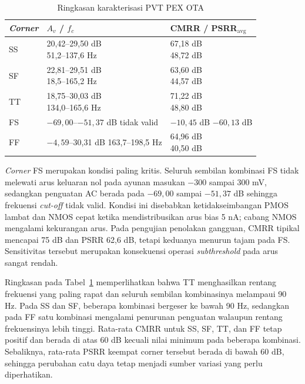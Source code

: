 \begin{table}[!ht]
\caption{Ringkasan karakterisasi PVT PEX OTA}
\label{tab:pvt-ringkas}
\centering
\footnotesize
\setlength{\tabcolsep}{3pt}
\renewcommand{\arraystretch}{1.12}
\begin{tabularx}{\columnwidth}{@{}l
  >{\centering\arraybackslash}X
  >{\centering\arraybackslash}X@{}}
\toprule
\textit{Corner} & $A_v$ / $f_c$ & CMRR / PSRR$_{\mathrm{avg}}$ \\
\midrule
SS & \shortstack{20,42--29,50 dB\\51,2--137,6 Hz} & \shortstack{67,18 dB\\48,72 dB} \\
SF & \shortstack{22,81--29,51 dB\\18,5--165,2 Hz} & \shortstack{63,60 dB\\44,57 dB} \\
TT & \shortstack{18,75--30,03 dB\\134,0--165,6 Hz} & \shortstack{71,22 dB\\48,80 dB} \\
FS & \shortstack{$-69{,}00$--$-51{,}37$ dB\\tidak valid} & \shortstack{$-10{,}45$ dB\\$-60{,}13$ dB} \\
FF & \shortstack{$-4{,}59$--30,31 dB\\163,7--198,5 Hz} & \shortstack{64,96 dB\\40,50 dB} \\
\bottomrule
\end{tabularx}
\end{table}

\textit{Corner} FS merupakan kondisi paling kritis. Seluruh sembilan kombinasi FS tidak melewati arus keluaran nol pada ayunan masukan $-300$ sampai 300 mV, sedangkan penguatan AC berada pada $-69{,}00$ sampai $-51{,}37$ dB sehingga frekuensi \textit{cut-off} tidak valid. Kondisi ini disebabkan ketidakseimbangan PMOS lambat dan NMOS cepat ketika mendistribusikan arus bias 5 nA; cabang NMOS mengalami kekurangan arus. Pada pengujian penolakan gangguan, CMRR tipikal mencapai 75 dB dan PSRR 62,6 dB, tetapi keduanya menurun tajam pada FS. Sensitivitas tersebut merupakan konsekuensi operasi \textit{subthreshold} pada arus sangat rendah.

Ringkasan pada Tabel~\ref{tab:pvt-ringkas} memperlihatkan bahwa TT menghasilkan rentang frekuensi yang paling rapat dan seluruh sembilan kombinasinya melampaui 90 Hz. Pada SS dan SF, beberapa kombinasi bergeser ke bawah 90 Hz, sedangkan pada FF satu kombinasi mengalami penurunan penguatan walaupun rentang frekuensinya lebih tinggi. Rata-rata CMRR untuk SS, SF, TT, dan FF tetap positif dan berada di atas 60 dB kecuali nilai minimum pada beberapa kombinasi. Sebaliknya, rata-rata PSRR keempat corner tersebut berada di bawah 60 dB, sehingga perubahan catu daya tetap menjadi sumber variasi yang perlu diperhatikan.

